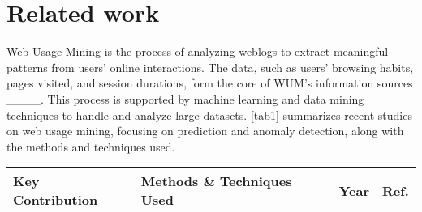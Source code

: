 \section{Related work}
\label{sec:2}

Web Usage Mining is the process of analyzing weblogs to extract meaningful patterns from users' online interactions. The data, such as users' browsing habits, pages visited, and session durations, form the core of WUM's information sources ____. This process is supported by machine learning and data mining techniques to handle and analyze large datasets. \cref{tab1} summarizes recent studies on web usage mining, focusing on prediction and anomaly detection, along with the methods and techniques used.


\begingroup
\setlength{\extrarowheight}{3pt}  %
\begin{table*}[htb]
	\setlength{\parindent}{0pt} %
	\centering
	\caption{Recent studies on web usage mining, prediction, and anomaly detection methods.}
	\label{tab1}
	\small
	\begin{tabular}{ m{} m{}
		>{\centering\arraybackslash}m{} >{\centering\arraybackslash}m{}  }
	\toprule
	\textbf{Key Contribution} & \textbf{Methods \& Techniques Used} & \textbf{Year} & \textbf{Ref.} \\ \hline 
	\midrule
	

\end{tabular}
\end{table*}
